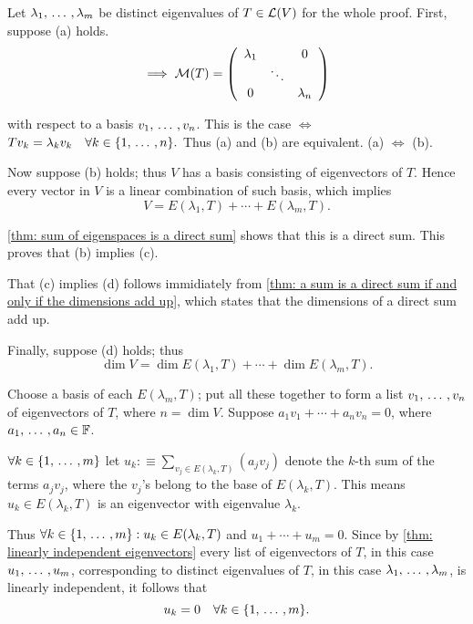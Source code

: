 \begin{prf}
  Let $\lambda_1, {\, \ldots \,\,}, \lambda_m$ be distinct eigenvalues of $T \in \mathcal{L} (V)$ for the whole proof. First, suppose (a) holds.
  \begin{equation}
    \implies
    \mathcal{M}(T) =
    \left( {\begin{array}{ccc}
        \lambda_1 &         & 0 \\
        &  \ddots &    \\
        0      &         & \lambda_n
    \end{array} } \right)
  \end{equation}

  with respect to a basis $v_1, {\, \ldots \,\,}, v_n$. This is the case $\iff$ $Tv_k = \lambda_k v_k \quad \forall k\in \{1, {\, \ldots \,\,}, n \}.$ Thus (a) and (b) are equivalent. (a) $\iff$ (b).

  Now suppose (b) holds; thus $V$ has a basis consisting of eigenvectors of $T$. Hence every vector in $V$ is a linear combination of such basis, which implies
  \begin{equation}
    V = E(\lambda_1, T) + \cdots + E(\lambda_m, T).
  \end{equation}

  \ref{thm: sum of eigenspaces is a direct sum} shows that this is a direct sum. This proves that (b) implies (c).

  That (c) implies (d) follows immidiately from \ref{thm: a sum is a direct sum if and only if the dimensions add up}, which states that the dimensions of a direct sum add up.

  Finally, suppose (d) holds; thus
  \begin{equation}
    \dim V = \dim E(\lambda_1, T) + \cdots + \dim E(\lambda_m, T).
  \end{equation}

  Choose a basis of each $E(\lambda_m, T)$; put all these together to form a list $v_1, {\, \ldots \,\,}, v_n$ of eigenvectors of $T$, where $n = \dim V$. Suppose $a_1 v_1 + \cdots + a_n v_n = 0$, where $a_1, {\, \ldots \,\,}, a_n \in \mathbb{F}$.

  $\forall k \in \{1, {\, \ldots \,\,}, m \} $ let
  $
    u_k :\equiv \sum_{v_j \in E(\lambda_k, T)} (a_j v_j)
  $
  denote the $k$-th sum of the terms $a_jv_j$, where the $v_j$'s belong to the base of $E(\lambda_k, T)$. This means $u_k \in E(\lambda_k, T)$ is an eigenvector with eigenvalue $\lambda_k$.

  Thus $\forall k \in \{1, {\, \ldots \,\,}, m \}: u_k \in E(\lambda_k, T)$ and $u_1 + \cdots + u_m = 0$. Since by \ref{thm: linearly independent eigenvectors}
  every list of eigenvectors of $T$, in this case $u_1, {\, \ldots \,\,}, u_m$, corresponding to distinct eigenvalues of $T$, in this case $\lambda_1, {\, \ldots \,\,}, \lambda_m$, is linearly independent, it follows that
  \begin{equation}
    u_k = 0 \quad \forall k \in \{1, {\, \ldots \,\,}, m \}.
  \end{equation}


\end{prf}
